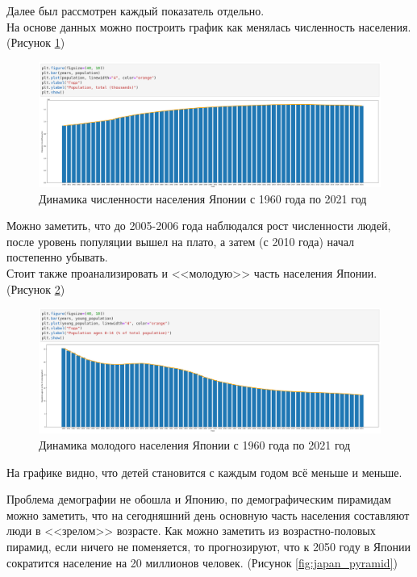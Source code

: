 \documentclass[14pt,fleqn]{extarticle}
\begin{document}
	\newpage
	
	Далее был рассмотрен каждый показатель отдельно.\\
	На основе данных можно построить график как менялась численность населения. (Рисунок \ref{fig:japan_population_plot})
	
	\begin{figure}[h]
		\centering \includegraphics[scale=0.42]{japan_population_plot}
		\caption{Динамика численности населения Японии с 1960 года по 2021 год}
		\label{fig:japan_population_plot}
	\end{figure}

	Можно заметить, что до 2005-2006 года наблюдался рост численности людей, после уровень популяции вышел на плато, а затем (с 2010 года) начал постепенно убывать.\\
	
	Стоит также проанализировать и <<молодую>> часть населения Японии. (Рисунок \ref{fig:japan_young_population_plot})
	
	\begin{figure}[h]
		\centering \includegraphics[scale=0.42]{japan_young_population_plot}
		\caption{Динамика молодого населения Японии с 1960 года по 2021 год}
		\label{fig:japan_young_population_plot}
	\end{figure}

	На графике видно, что детей становится с каждым годом всё меньше и меньше.
	
	\newpage
	
	Проблема демографии не обошла и Японию, по демографическим пирамидам можно заметить, что на сегодняшний день основную часть населения составляют люди в <<зрелом>> возрасте. Как можно заметить из возрастно-половых пирамид, если ничего не поменяется, то прогнозируют, что к 2050 году в Японии сократится население на 20 миллионов человек. (Рисунок \ref{fig:japan_pyramid})
	
\end{document}
